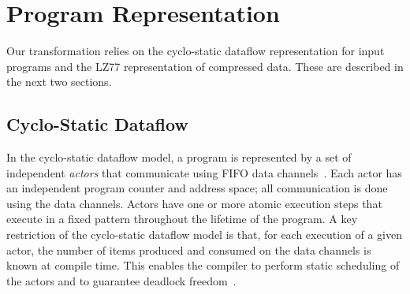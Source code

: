 \newcommand{\x}{\hspace{1.3pt}} %
\newcommand{\concat}[0]{\bullet}               %
\newcommand{\name}[1]{~~\hfill\framebox{#1}}   %

\newcommand{\skiptop}[0]{\vspace{-13pt}\\}   %
\newcommand{\skiptopa}[0]{\vspace{-1pt}\\}   %
\newcommand{\skiptopb}[0]{\vspace{-3pt}\\}   %
\newcommand{\skipbot}[0]{\vspace{-3pt}\\}    %

\newcommand{\tup}[2]{\langle#1, #2\rangle}

\newcommand{\pos}[0]{\mbox{\it pos}}

\newcommand{\tab}[0]{\mbox{~~~~}}


\section{Program Representation}

Our transformation relies on the cyclo-static dataflow representation
for input programs and the LZ77 representation of compressed data.
These are described in the next two sections.

\subsection{Cyclo-Static Dataflow}

In the cyclo-static dataflow model, a program is represented by a set
of independent {\it actors} that communicate using FIFO data
channels~\cite{LM87-i,bilsen95-cyclostatic}.  Each actor has an
independent program counter and address space; all communication is
done using the data channels.  Actors have one or more atomic
execution steps that execute in a fixed pattern throughout the
lifetime of the program.  A key restriction of the cyclo-static
dataflow model is that, for each execution of a given actor, the
number of items produced and consumed on the data channels is known at
compile time.  This enables the compiler to perform static scheduling
of the actors and to guarantee deadlock freedom~\cite{LM87-i,bilsen95-cyclostatic}.

